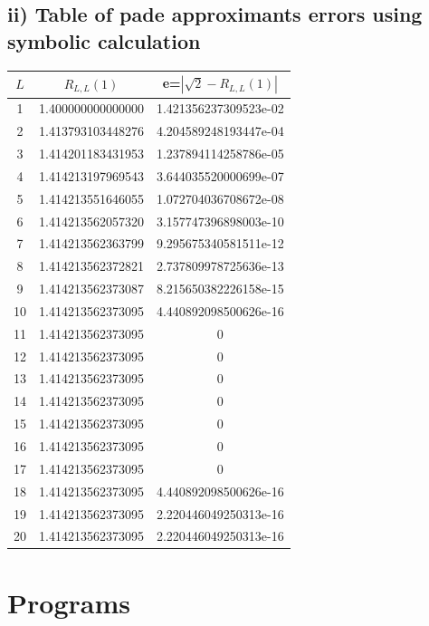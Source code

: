 \documentclass[10pt]{article}
\begin{document}
\subsection*{ii) Table of pade approximants errors using symbolic calculation}
    \begin{tabular}{c|c|c}
    $L$ & $R_{L,L}(1)$ & e=$|\sqrt{2}-R_{L,L}(1)|$\\
    \hline
    1  &   1.400000000000000    & 1.421356237309523e-02\\
     2  &   1.413793103448276 &    4.204589248193447e-04\\
     3  &   1.414201183431953 &    1.237894114258786e-05\\
     4  &   1.414213197969543 &    3.644035520000699e-07\\
     5  &   1.414213551646055 &    1.072704036708672e-08\\
     6  &   1.414213562057320 &    3.157747396898003e-10\\
     7  &   1.414213562363799 &    9.295675340581511e-12\\
     8  &   1.414213562372821 &    2.737809978725636e-13\\
     9  &   1.414213562373087 &    8.215650382226158e-15\\
     10  &   1.414213562373095 &    4.440892098500626e-16\\
     11  &   1.414213562373095 &                        0\\
     12  &   1.414213562373095 &                        0\\
     13  &   1.414213562373095 &                        0\\
     14  &   1.414213562373095 &                        0\\
     15  &   1.414213562373095 &                        0\\
     16  &   1.414213562373095 &                        0\\
     17  &   1.414213562373095 &                        0\\
     18  &   1.414213562373095 &    4.440892098500626e-16\\
     19  &   1.414213562373095 &    2.220446049250313e-16\\
     20  &   1.414213562373095 &    2.220446049250313e-16
    \end{tabular}


\newpage
\section*{Programs}
\end{document}
